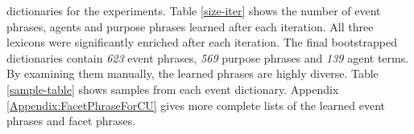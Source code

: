 dictionaries for the experiments.  
Table \ref{size-iter} shows the number of event phrases, agents and
purpose phrases learned after each iteration.  All three lexicons were
significantly enriched after each iteration.
The final
bootstrapped dictionaries contain {\it 623} event phrases, {\it 569}
purpose phrases and {\it 139} agent terms.
By examining them manually, the learned phrases are highly diverse. 
Table \ref{sample-table} shows samples from each event dictionary.
Appendix \ref{Appendix:FacetPhraseForCU} gives more complete lists of 
the learned 
event phrases and facet phrases.

